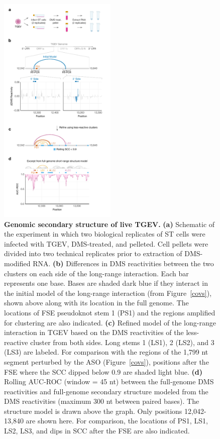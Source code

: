 \documentclass[main.tex]{subfiles}
\begin{document}
\begin{figure}[H]
	\includegraphics[width=0.5\textwidth]{../MainFigures/tgev/tgev.pdf}
	\caption{\textbf{Genomic secondary structure of live TGEV.} \textbf{(a)} Schematic of the experiment in which two biological replicates of ST cells were infected with TGEV, DMS-treated, and pelleted. Cell pellets were divided into two technical replicates prior to extraction of DMS-modified RNA. \textbf{(b)} Differences in DMS reactivities between the two clusters on each side of the long-range interaction. Each bar represents one base. Bases are shaded dark blue if they interact in the initial model of the long-range interaction (from Figure~\ref{covs}), shown above along with its location in the full genome. The locations of FSE pseudoknot stem 1 (PS1) and the regions amplified for clustering are also indicated. \textbf{(c)} Refined model of the long-range interaction in TGEV based on the DMS reactivities of the less-reactive cluster from both sides. Long stems 1 (LS1), 2 (LS2), and 3 (LS3) are labeled. For comparison with the regions of the 1,799 nt segment perturbed by the ASO (Figure~\ref{covs}), positions after the FSE where the SCC dipped below 0.9 are shaded light blue. \textbf{(d)} Rolling AUC-ROC (window = 45 nt) between the full-genome DMS reactivities and full-genome secondary structure modeled from the DMS reactivities (maximum 300 nt between paired bases). The structure model is drawn above the graph. Only positions 12,042-13,840 are shown here. For comparison, the locations of PS1, LS1, LS2, LS3, and dips in SCC after the FSE are also indicated.}
	\label{tgev}
\end{figure}
\end{document}
